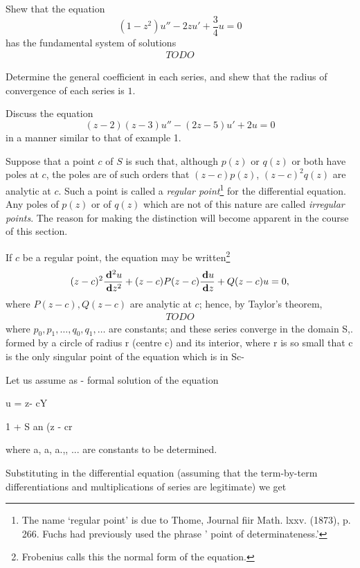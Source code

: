 \begin{wandwexample}
Shew that the equation
$$
(1 - z^{2}) u'' - 2 z u' + \frac{3}{4} u = 0
$$
has the fundamental system of solutions
\begin{align*}
  TODO
\end{align*}

Determine the general coefficient in each series, and shew that the
radius of convergence of each series is $1$.
\end{wandwexample}
\begin{wandwexample}
Discuss the equation
$$
(z-2)(z-3) u'' - (2z-5) u' + 2u = 0
$$
in a manner similar to that of example 1.
\end{wandwexample}
%
Suppose that a point $c$ of $S$ is such that, although $p(z)$ or $q(z)$ or
both have poles at $c$, the poles are of such orders that
$(z - c) p(z)$, $(z- c)^{2} q(z)$ are analytic at $c$.
Such a point is called a \emph{regular point}\footnote{The name
  `regular point' is due to
  Thome, Journal fiir Math. lxxv. (1873), p. 266. %
  Fuchs had previously used the phrase ' point of determinateness.'}
for the differential equation. Any poles of $p(z)$ or of $q(z)$ which are
not of this nature are called \emph{irregular points}. The reason for making
the distinction will become apparent in the course of this section.

If $c$ be a regular point, the equation may be written\footnote{Frobenius
  calls this the normal form of the equation.}
$$
(z-c)^{2} \frac{\, \mathbf{d}^{2} u}{\, \mathbf{d} z^{2}}
+ (z-c) P(z-c) \frac{\, \mathbf{d} u}{\, \mathbf{d} z}
+ Q(z-c) u = 0,
$$
where $P(z - c), Q(z - c)$ are analytic at $c$; hence, by Taylor's
theorem,
\begin{align*}
  TODO
\end{align*}
where $p_{0}, p_{1}, \ldots, q_{0}, q_{1}, \ldots$ are constants; and these series
converge in the domain S,. formed by a circle of radius r (centre c)
and its interior, where r is so small that c is the only singular
point of the equation which is in Sc-

Let us assume as - formal solution of the equation

u = z- cY

1 + S an (z - cr

where a, a, a.,, ... are constants to be determined.

%
%

Substituting in the differential equation (assuming that the
term-by-term differentiations and multiplications of series are
legitimate) we get

